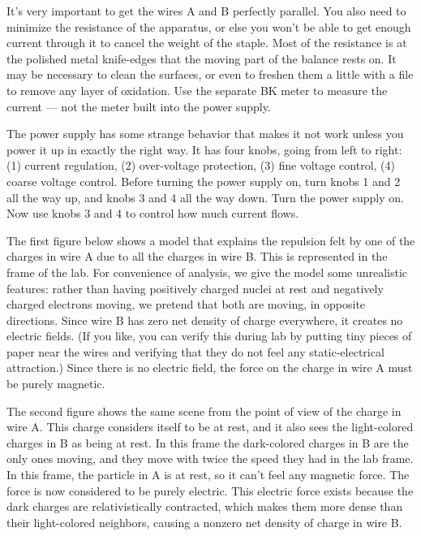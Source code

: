 It's very important to get the wires A and B perfectly parallel. You also
need to minimize the resistance of the apparatus, or else you won't be
able to get enough current through it to cancel the weight of the staple.
Most of the resistance is at the polished metal knife-edges that the
moving part of the balance rests on. It may be necessary to clean the
surfaces, or even to freshen them a little with a file to remove any layer
of oxidation. Use the separate BK meter to measure the current --- not the
meter built into the power supply.

The power supply has some strange behavior that makes it not work unless
you power it up in exactly the right way. It has four knobs, going from
left to right: (1) current regulation, (2) over-voltage protection, (3)
fine voltage control, (4) coarse voltage control. Before turning the power
supply on, turn knobs 1 and 2 all the way up, and knobs 3 and 4 all the way
down. Turn the power supply on. Now use knobs 3 and 4 to control how much
current flows.

\pagebreak

\analysis

The first figure below shows a model that explains the repulsion felt by
one of the charges in wire A due to all the charges in wire B. This
is represented in the frame of the lab. For convenience of analysis,
we give the model some unrealistic features: rather than having positively
charged nuclei at rest and negatively charged electrons moving, we pretend
that both are moving, in opposite directions. Since wire B has zero net
density of charge everywhere, it creates no electric fields. (If you like,
you can verify this during lab by putting tiny pieces of paper near the
wires and verifying that they do not feel any static-electrical attraction.)
Since there is no electric field, the force on
the charge in wire A must be purely magnetic.


The second figure shows the same scene from the point of view of the
charge in wire A. This charge considers itself to be at rest, and it
also sees the light-colored charges in B as being at rest. In this
frame the dark-colored charges in B are the only ones moving, and they
move with twice the
speed they had in the lab frame. In this frame, the particle in A
is at rest, so it can't feel any magnetic force. The force is now
considered to be purely electric. This electric force exists because
the dark charges are relativistically contracted, which makes them more dense than their
light-colored neighbors, causing a nonzero net density of charge in
wire B. 

